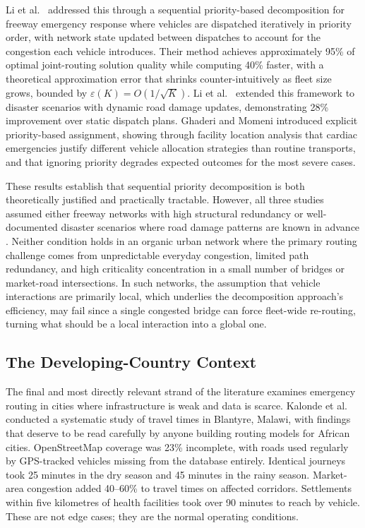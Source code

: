 \documentclass[paper=A4, 12pt, mathscr]{report}
\begin{document}
	Li et al.\ \cite{12} addressed this through a sequential priority-based
	decomposition for freeway emergency response where vehicles are dispatched
	iteratively in priority order, with network state updated between dispatches
	to account for the congestion each vehicle introduces. Their method achieves
	approximately 95\% of optimal joint-routing solution quality while computing
	40\% faster, with a theoretical approximation error that shrinks
	counter-intuitively as fleet size grows, bounded by $\varepsilon(K) =
	O(1/\sqrt{K})$. Li et al.\ \cite{14} extended this framework to disaster
	scenarios with dynamic road damage updates, demonstrating 28\% improvement
	over static dispatch plans. Ghaderi and Momeni \cite{7} introduced explicit
	priority-based assignment, showing through facility location analysis that
	cardiac emergencies justify different vehicle allocation strategies than
	routine transports, and that ignoring priority degrades expected outcomes
	for the most severe cases.
	
	These results establish that sequential priority decomposition is both
	theoretically justified and practically tractable. However, all three studies
	assumed either freeway networks with high structural redundancy \cite{12}
	or well-documented disaster scenarios where road damage patterns are known in
	advance \cite{14}. Neither condition holds in an organic urban network where
	the primary routing challenge comes from unpredictable everyday congestion,
	limited path redundancy, and high criticality concentration in a small number
	of bridges or market-road intersections. In such networks, the assumption that
	vehicle interactions are primarily local, which underlies the decomposition
	approach's efficiency, may fail since a single congested bridge can force
	fleet-wide re-routing, turning what should be a local interaction into a
	global one.
	
	\subsection*{The Developing-Country Context}
	
	The final and most directly relevant strand of the literature examines
	emergency routing in cities where infrastructure is weak and data is scarce.
	Kalonde et al.\ \cite{9} conducted a systematic study of travel times in
	Blantyre, Malawi, with findings that deserve to be read carefully by anyone
	building routing models for African cities. OpenStreetMap coverage was 23\%
	incomplete, with roads used regularly by GPS-tracked vehicles missing from
	the database entirely. Identical journeys took 25 minutes in the dry season
	and 45 minutes in the rainy season. Market-area congestion added 40--60\%
	to travel times on affected corridors. Settlements within five kilometres of
	health facilities took over 90 minutes to reach by vehicle. These are not
	edge cases; they are the normal operating conditions.
	
\end{document}

